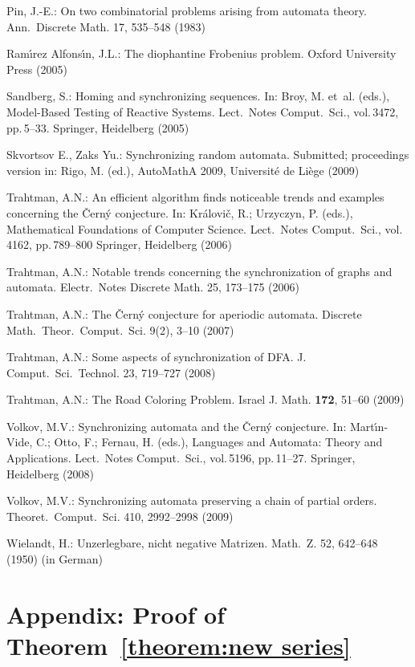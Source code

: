 \documentclass[11pt]{llncs}
\begin{document}
\begin{thebibliography}{99}
Pin, J.-E.: On two combinatorial problems arising from automata
theory. Ann.\ Discrete Math. 17, 535--548 (1983)

Ram\'{\i}rez Alfons\'{\i}n, J.L.: The diophantine Frobenius problem.
Oxford University Press (2005)

Sandberg, S.: Homing and synchronizing sequences. In: Broy, M.
et~al. (eds.), Model-Based Testing of Reactive Systems. Lect.\
Notes Comput.\ Sci., vol.\,3472, pp.\,5--33. Springer, Heidelberg
(2005)

Skvortsov E., Zaks Yu.: Synchronizing random automata. Submitted;
proceedings version in: Rigo, M. (ed.), AutoMathA 2009, Universit\'e
de Li\`ege (2009)

Trahtman, A.N.: An efficient algorithm finds noticeable trends
and examples concerning the \v{C}ern\'y conjecture. In:
Kr\'alovi\v{c}, R.; Urzyczyn, P. (eds.), Mathematical Foundations
of Computer Science. Lect.\ Notes Comput.\ Sci., vol.\,4162, pp.\,789--800
Springer, Heidelberg (2006)

Trahtman, A.N.: Notable trends concerning the synchronization
of graphs and automata. Electr.\ Notes Discrete Math. 25, 173--175 (2006)

Trahtman, A.N.: The \v{C}ern\'y conjecture for aperiodic automata.
Discrete Math.\ Theor.\ Comput.\ Sci. 9(2), 3--10 (2007)

Trahtman, A.N.: Some aspects of synchronization of DFA. J. Comput.\ Sci.\
Technol. 23, 719--727 (2008)

Trahtman, A.N.: The Road Coloring Problem. Israel J. Math.
\textbf{172}, 51--60 (2009)

Volkov, M.V.: Synchronizing automata and the \v{C}ern\'{y}
conjecture. In: Mart\'\i{}n-Vide, C.; Otto, F.; Fernau, H. (eds.),
Languages and Automata: Theory and Applications. Lect.\ Notes
Comput.\ Sci., vol.\,5196, pp.\,11--27.  Springer, Heidelberg (2008)

\bibitem{Vo09}
Volkov, M.V.: Synchronizing automata preserving a chain of partial
orders. Theoret.\ Comput.\ Sci. 410, 2992--2998 (2009)

Wielandt, H.: Unzerlegbare, nicht negative Matrizen. Math.\ Z.
52, 642--648 (1950) (in German)
\end{thebibliography}


\section*{Appendix: Proof of Theorem~\ref{theorem:new series}}
\end{document}
